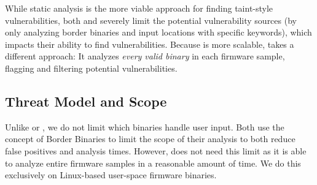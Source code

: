 

\smallskip

While static analysis is the more viable approach for finding taint-style vulnerabilities, both \karonte and \satc severely limit the potential vulnerability sources (by only analyzing border binaries and input locations with specific keywords), which impacts their ability to find vulnerabilities.
Because \rda is more scalable, \mango takes a different approach:
It analyzes \emph{every valid binary} in each firmware sample, flagging and filtering potential vulnerabilities.

\subsection{Threat Model and Scope}
\label{sec:threat_model}

Unlike \karonte or \satc, we do not limit which binaries handle user input.
Both use the concept of Border Binaries to limit the scope of their analysis to both reduce false positives and analysis times.
However, \mango does not need this limit as it is able to analyze entire firmware samples in a reasonable amount of time.
We do this exclusively on Linux-based user-space firmware binaries.




